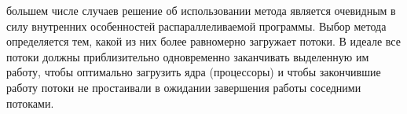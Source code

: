 {	 большем числе случаев решение об использовании метода является очевидным в силу внутренних особенностей распараллеливаемой программы. Выбор метода определяется тем, какой из них более равномерно загружает потоки. В идеале все потоки должны приблизительно одновременно заканчивать выделенную им работу, чтобы оптимально загрузить ядра (процессоры) и чтобы закончившие работу потоки не простаивали в ожидании завершения работы соседними потоками.
	\par
}